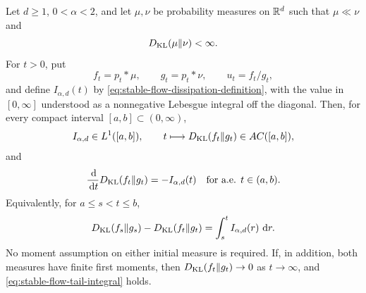 \begin{theorem}
\label{thm:stable-flow-finite-entropy-domain}
Let \(d\ge1\), \(0<\alpha<2\), and let \(\mu,\nu\) be probability
measures on \(\mathbb{R}^d\) such that \(\mu\ll\nu\) and
\begin{equation}\label{eq:stable-flow-finite-initial-entropy}
 D_{\rm KL}(\mu\|\nu)<\infty .
\end{equation}
For \(t>0\), put
\[
 f_t=p_t*\mu,\qquad g_t=p_t*\nu,\qquad u_t=f_t/g_t,
\]
and define \(I_{\alpha,d}(t)\) by
\eqref{eq:stable-flow-dissipation-definition}, with the value in
\([0,\infty]\) understood as a nonnegative Lebesgue integral off the
diagonal.  Then, for every compact interval \([a,b]\subset(0,\infty)\),
\[
 I_{\alpha,d}\in L^1([a,b]),\qquad
 t\longmapsto D_{\rm KL}(f_t\|g_t)\in AC([a,b]),
\]
and
\begin{equation}\label{eq:stable-flow-finite-entropy-identity}
 \frac{\,\mathrm{d}}{\,\mathrm{d} t}D_{\rm KL}(f_t\|g_t)=-I_{\alpha,d}(t)
 \quad\text{for a.e. }t\in(a,b).
\end{equation}
Equivalently, for \(a\le s<t\le b\),
\begin{equation}\label{eq:stable-flow-finite-entropy-integrated-identity}
 D_{\rm KL}(f_s\|g_s)-D_{\rm KL}(f_t\|g_t)
 =\int_s^t I_{\alpha,d}(r)\,\,\mathrm{d} r .
\end{equation}
No moment assumption on either initial measure is required.  If, in addition,
both measures have finite first moments, then
\(D_{\rm KL}(f_t\|g_t)\to0\) as \(t\to\infty\), and
\eqref{eq:stable-flow-tail-integral} holds.
\end{theorem}

